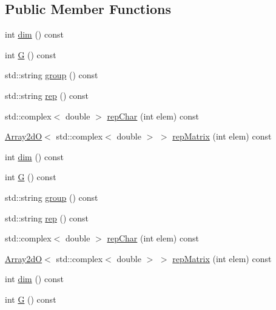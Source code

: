 \subsection*{Public Member Functions}
\begin{DoxyCompactItemize}
\item 
int \mbox{\hyperlink{structHadron_1_1C4nm0ERep_ad264e17a212eb7e2cf71ba25f16caa06}{dim}} () const
\item 
int \mbox{\hyperlink{structHadron_1_1C4nm0ERep_aeed131ece7b7c5203a64ac3591c75f59}{G}} () const
\item 
std\+::string \mbox{\hyperlink{structHadron_1_1C4nm0ERep_a0d17268ef31fa011daabf7af62deec34}{group}} () const
\item 
std\+::string \mbox{\hyperlink{structHadron_1_1C4nm0ERep_a7f4628e8d080d5552176c65fcbd66e84}{rep}} () const
\item 
std\+::complex$<$ double $>$ \mbox{\hyperlink{structHadron_1_1C4nm0ERep_ae2587ec63f886eaafedfaede40ebdba5}{rep\+Char}} (int elem) const
\item 
\mbox{\hyperlink{classADAT_1_1Array2dO}{Array2dO}}$<$ std\+::complex$<$ double $>$ $>$ \mbox{\hyperlink{structHadron_1_1C4nm0ERep_aa9353c0f2a226224911c51db6f647ccf}{rep\+Matrix}} (int elem) const
\item 
int \mbox{\hyperlink{structHadron_1_1C4nm0ERep_ad264e17a212eb7e2cf71ba25f16caa06}{dim}} () const
\item 
int \mbox{\hyperlink{structHadron_1_1C4nm0ERep_aeed131ece7b7c5203a64ac3591c75f59}{G}} () const
\item 
std\+::string \mbox{\hyperlink{structHadron_1_1C4nm0ERep_a0d17268ef31fa011daabf7af62deec34}{group}} () const
\item 
std\+::string \mbox{\hyperlink{structHadron_1_1C4nm0ERep_a7f4628e8d080d5552176c65fcbd66e84}{rep}} () const
\item 
std\+::complex$<$ double $>$ \mbox{\hyperlink{structHadron_1_1C4nm0ERep_ae2587ec63f886eaafedfaede40ebdba5}{rep\+Char}} (int elem) const
\item 
\mbox{\hyperlink{classADAT_1_1Array2dO}{Array2dO}}$<$ std\+::complex$<$ double $>$ $>$ \mbox{\hyperlink{structHadron_1_1C4nm0ERep_aa9353c0f2a226224911c51db6f647ccf}{rep\+Matrix}} (int elem) const
\item 
int \mbox{\hyperlink{structHadron_1_1C4nm0ERep_ad264e17a212eb7e2cf71ba25f16caa06}{dim}} () const
\item 
int \mbox{\hyperlink{structHadron_1_1C4nm0ERep_aeed131ece7b7c5203a64ac3591c75f59}{G}} () const
\item 

\end{DoxyCompactItemize}

